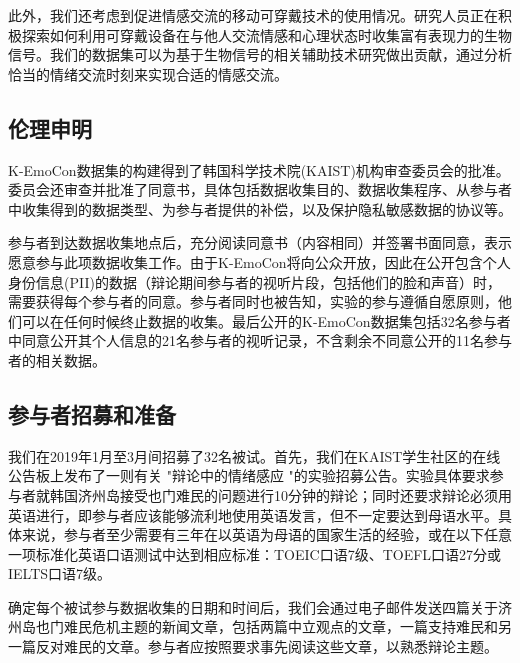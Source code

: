 此外，我们还考虑到促进情感交流的移动可穿戴技术的使用情况。研究人员正在积极探索如何利用可穿戴设备在与他人交流情感和心理状态时收集富有表现力的生物信号。我们的数据集可以为基于生物信号的相关辅助技术研究做出贡献，通过分析恰当的情绪交流时刻来实现合适的情感交流。
\subsection{伦理申明}
K-EmoCon数据集的构建得到了韩国科学技术院(KAIST)机构审查委员会的批准。委员会还审查并批准了同意书，具体包括数据收集目的、数据收集程序、从参与者中收集得到的数据类型、为参与者提供的补偿，以及保护隐私敏感数据的协议等。

参与者到达数据收集地点后，充分阅读同意书（内容相同）并签署书面同意，表示愿意参与此项数据收集工作。由于K-EmoCon将向公众开放，因此在公开包含个人身份信息(PII)的数据（辩论期间参与者的视听片段，包括他们的脸和声音）时，需要获得每个参与者的同意。参与者同时也被告知，实验的参与遵循自愿原则，他们可以在任何时候终止数据的收集。最后公开的K-EmoCon数据集包括32名参与者中同意公开其个人信息的21名参与者的视听记录，不含剩余不同意公开的11名参与者的相关数据。
\subsection{参与者招募和准备}
我们在2019年1月至3月间招募了32名被试。首先，我们在KAIST学生社区的在线公告板上发布了一则有关 "辩论中的情绪感应 "的实验招募公告。实验具体要求参与者就韩国济州岛接受也门难民的问题进行10分钟的辩论；同时还要求辩论必须用英语进行，即参与者应该能够流利地使用英语发言，但不一定要达到母语水平。具体来说，参与者至少需要有三年在以英语为母语的国家生活的经验，或在以下任意一项标准化英语口语测试中达到相应标准：TOEIC口语7级、TOEFL口语27分或IELTS口语7级。

确定每个被试参与数据收集的日期和时间后，我们会通过电子邮件发送四篇关于济州岛也门难民危机主题的新闻文章，包括两篇中立观点的文章，一篇支持难民和另一篇反对难民的文章。参与者应按照要求事先阅读这些文章，以熟悉辩论主题。

